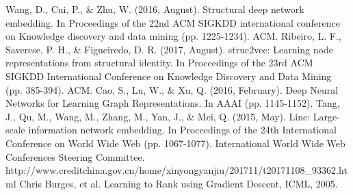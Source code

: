 \begin{thebibliography}{99}
Wang, D., Cui, P., \& Zhu, W. (2016, August). Structural deep network embedding. In Proceedings of the 22nd ACM SIGKDD international conference on Knowledge discovery and data mining (pp. 1225-1234). ACM.
 Ribeiro, L. F., Saverese, P. H., \& Figueiredo, D. R. (2017, August). struc2vec: Learning node representations from structural identity. In Proceedings of the 23rd ACM SIGKDD International Conference on Knowledge Discovery and Data Mining (pp. 385-394). ACM.
 Cao, S., Lu, W., \& Xu, Q. (2016, February). Deep Neural Networks for Learning Graph Representations. In AAAI (pp. 1145-1152).
 Tang, J., Qu, M., Wang, M., Zhang, M., Yan, J., \& Mei, Q. (2015, May). Line: Large-scale information network embedding. In Proceedings of the 24th International Conference on World Wide Web (pp. 1067-1077). International World Wide Web Conferences Steering Committee.
 http://www.creditchina.gov.cn/home/xinyongyanjiu/201711/t20171108\_93362.html
 Chris Burges, et al. Learning to Rank using Gradient Descent, ICML, 2005.
\end{thebibliography}


